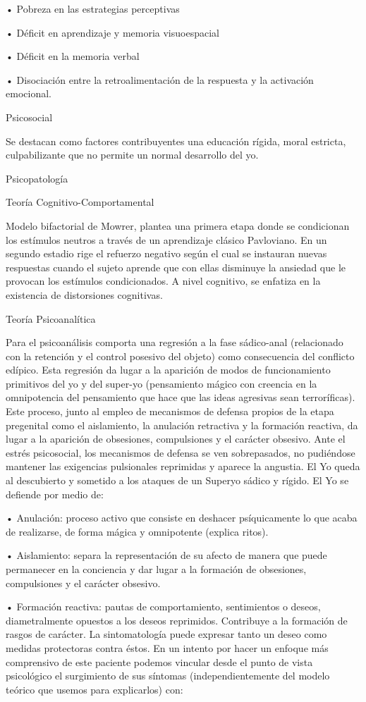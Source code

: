 \documentclass[encares.tex]{subfiles}
\begin{document}
• Pobreza en las estrategias perceptivas

• Déficit en aprendizaje y memoria visuoespacial

• Déficit en la memoria verbal

• Disociación entre la retroalimentación de la respuesta y la activación emocional.

Psicosocial

Se destacan como factores contribuyentes una educación rígida, moral estricta, culpabilizante que no permite un normal desarrollo del yo.

Psicopatología

Teoría Cognitivo-Comportamental

Modelo bifactorial de Mowrer, plantea una primera etapa donde se condicionan los estímulos neutros a través de un aprendizaje clásico Pavloviano. En un segundo estadio rige el refuerzo negativo según el cual se instauran nuevas respuestas cuando el sujeto aprende que con ellas disminuye la ansiedad que le provocan los estímulos condicionados. A nivel cognitivo, se enfatiza en la existencia de distorsiones cognitivas.

Teoría Psicoanalítica

Para el psicoanálisis comporta una regresión a la fase sádico-anal (relacionado con la retención y el control posesivo del objeto) como consecuencia del conflicto edípico. Esta regresión da lugar a la aparición de modos de funcionamiento primitivos del yo y del super-yo (pensamiento mágico con creencia en la omnipotencia del pensamiento que hace que las ideas agresivas sean terroríficas). Este proceso, junto al empleo de mecanismos de defensa propios de la etapa pregenital como el aislamiento, la anulación retractiva y la formación reactiva, da lugar a la aparición de obsesiones, compulsiones y el carácter obsesivo. Ante el estrés psicosocial, los mecanismos de defensa se ven sobrepasados, no pudiéndose mantener las exigencias pulsionales reprimidas y aparece la angustia. El Yo queda al descubierto y sometido a los ataques de un Superyo sádico y rígido. El Yo se defiende por medio de:

• Anulación: proceso activo que consiste en deshacer psíquicamente lo que acaba de realizarse, de forma mágica y omnipotente (explica ritos).

• Aislamiento: separa la representación de su afecto de manera que puede permanecer en la conciencia y dar lugar a la formación de obsesiones, compulsiones y el carácter obsesivo.

• Formación reactiva: pautas de comportamiento, sentimientos o deseos, diametralmente opuestos a los deseos reprimidos. Contribuye a la formación de rasgos de carácter. La sintomatología puede expresar tanto un deseo como medidas protectoras contra éstos. En un intento por hacer un enfoque más comprensivo de este paciente podemos vincular desde el punto de vista psicológico el surgimiento de sus síntomas (independientemente del modelo teórico que usemos para explicarlos) con:
\end{document}
